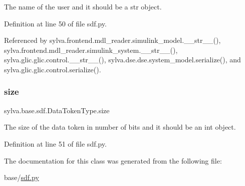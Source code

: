 The name of the user and it should be a str object. 



Definition at line 50 of file sdf.\+py.



Referenced by sylva.\+frontend.\+mdl\+\_\+reader.\+simulink\+\_\+model.\+\_\+\+\_\+str\+\_\+\+\_\+(), sylva.\+frontend.\+mdl\+\_\+reader.\+simulink\+\_\+system.\+\_\+\+\_\+str\+\_\+\+\_\+(), sylva.\+glic.\+glic.\+control.\+\_\+\+\_\+str\+\_\+\+\_\+(), sylva.\+dse.\+dse.\+system\+\_\+model.\+serialize(), and sylva.\+glic.\+glic.\+control.\+serialize().

\mbox{\label{classsylva_1_1base_1_1sdf_1_1_data_token_type_abf397c07db4eced64bf773de13fcbbf0}} 
\subsubsection{\texorpdfstring{size}{size}}
{\footnotesize\ttfamily sylva.\+base.\+sdf.\+Data\+Token\+Type.\+size}



The size of the data token in number of bits and it should be an int object. 



Definition at line 51 of file sdf.\+py.



The documentation for this class was generated from the following file\+:\begin{DoxyCompactItemize}
\item 
base/\hyperlink{sdf_8py}{sdf.\+py}\end{DoxyCompactItemize}
